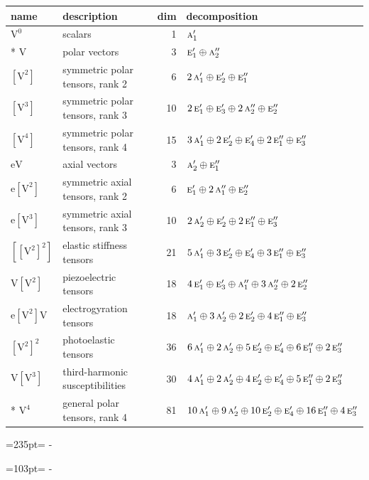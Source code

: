\documentclass[10pt,a4paper]{article}
\newcommand{\needspace}[1]{\par\penalty-100\begingroup\dimen0=#1\relax\dimen2=\pagegoal
  \advance\dimen2-\pagetotal\ifdim\dimen0>\dimen2\relax\ifdim\dimen2>0pt\vfil\break\fi\fi
  \endgroup}
\numberwithin{equation}{section}
\newcommand{\irr}[1]{\text{\normalfont\scshape #1}}
\newcommand{\jahn}[1]{\mathrm{#1}}
\newlength{\fillwidth}\newlength{\cellwidth}\newlength{\colwidth}
\begin{document}
{\begin{longtable}{@{}llr>{\RaggedRight\arraybackslash}p{\fillwidth}@{}}
name & description & dim & decomposition\\\midrule\endhead
\bottomrule\endfoot\endlastfoot
$\jahn{V^{0}}$ & scalars & 1 & $\irr{a}_{1}'$\\*
$\jahn{V}$ & polar vectors & 3 & $\irr{e}_{1}' \oplus\allowbreak \irr{a}_{2}''$\\
$\jahn{[V^{2}]}$ & symmetric polar tensors, rank 2 & 6 & $2\,\irr{a}_{1}' \oplus\allowbreak \irr{e}_{2}' \oplus\allowbreak \irr{e}_{1}''$\\
$\jahn{[V^{3}]}$ & symmetric polar tensors, rank 3 & 10 & $2\,\irr{e}_{1}' \oplus\allowbreak \irr{e}_{3}' \oplus\allowbreak 2\,\irr{a}_{2}'' \oplus\allowbreak \irr{e}_{2}''$\\
$\jahn{[V^{4}]}$ & symmetric polar tensors, rank 4 & 15 & $3\,\irr{a}_{1}' \oplus\allowbreak 2\,\irr{e}_{2}' \oplus\allowbreak \irr{e}_{4}' \oplus\allowbreak 2\,\irr{e}_{1}'' \oplus\allowbreak \irr{e}_{3}''$\\
$\jahn{eV}$ & axial vectors & 3 & $\irr{a}_{2}' \oplus\allowbreak \irr{e}_{1}''$\\
$\jahn{e[V^{2}]}$ & symmetric axial tensors, rank 2 & 6 & $\irr{e}_{1}' \oplus\allowbreak 2\,\irr{a}_{1}'' \oplus\allowbreak \irr{e}_{2}''$\\
$\jahn{e[V^{3}]}$ & symmetric axial tensors, rank 3 & 10 & $2\,\irr{a}_{2}' \oplus\allowbreak \irr{e}_{2}' \oplus\allowbreak 2\,\irr{e}_{1}'' \oplus\allowbreak \irr{e}_{3}''$\\
$\jahn{[[V^{2}]^{2}]}$ & elastic stiffness tensors & 21 & $5\,\irr{a}_{1}' \oplus\allowbreak 3\,\irr{e}_{2}' \oplus\allowbreak \irr{e}_{4}' \oplus\allowbreak 3\,\irr{e}_{1}'' \oplus\allowbreak \irr{e}_{3}''$\\
$\jahn{V[V^{2}]}$ & piezoelectric tensors & 18 & $4\,\irr{e}_{1}' \oplus\allowbreak \irr{e}_{3}' \oplus\allowbreak \irr{a}_{1}'' \oplus\allowbreak 3\,\irr{a}_{2}'' \oplus\allowbreak 2\,\irr{e}_{2}''$\\
$\jahn{e[V^{2}]V}$ & electrogyration tensors & 18 & $\irr{a}_{1}' \oplus\allowbreak 3\,\irr{a}_{2}' \oplus\allowbreak 2\,\irr{e}_{2}' \oplus\allowbreak 4\,\irr{e}_{1}'' \oplus\allowbreak \irr{e}_{3}''$\\
$\jahn{[V^{2}]^{2}}$ & photoelastic tensors & 36 & $6\,\irr{a}_{1}' \oplus\allowbreak 2\,\irr{a}_{2}' \oplus\allowbreak 5\,\irr{e}_{2}' \oplus\allowbreak \irr{e}_{4}' \oplus\allowbreak 6\,\irr{e}_{1}'' \oplus\allowbreak 2\,\irr{e}_{3}''$\\
$\jahn{V[V^{3}]}$ & third-harmonic susceptibilities & 30 & $4\,\irr{a}_{1}' \oplus\allowbreak 2\,\irr{a}_{2}' \oplus\allowbreak 4\,\irr{e}_{2}' \oplus\allowbreak \irr{e}_{4}' \oplus\allowbreak 5\,\irr{e}_{1}'' \oplus\allowbreak 2\,\irr{e}_{3}''$\\*
$\jahn{V^{4}}$ & general polar tensors, rank 4 & 81 & $10\,\irr{a}_{1}' \oplus\allowbreak 9\,\irr{a}_{2}' \oplus\allowbreak 10\,\irr{e}_{2}' \oplus\allowbreak \irr{e}_{4}' \oplus\allowbreak 16\,\irr{e}_{1}'' \oplus\allowbreak 4\,\irr{e}_{3}''$\\
\bottomrule\end{longtable}}
\needspace{235pt}
\needspace{103pt}
\end{document}
